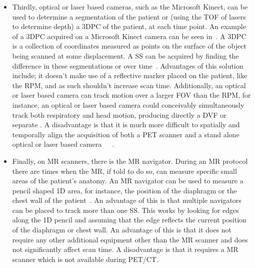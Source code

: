 \begin{itemize}
                    \item Thirdly, optical or laser based cameras, such as the Microsoft Kinect, can be used to determine a segmentation of the patient or (using the \gls{TOF} of lasers to determine depth) a \gls{3DPC} of the patient, at each time point. An example of a \gls{3DPC} acquired on a Microsoft Kinect camera can be seen in~. A \gls{3DPC} is a collection of coordinates measured as points on the surface of the object being scanned at some displacement. A \gls{SS} can be acquired by finding the difference in these segmentations or  over time~. Advantages of this solution include; it doesn't make use of a reflective marker placed on the patient, like the \gls{RPM}, and as such shouldn't increase scan time. Additionally, an optical or laser based camera can track motion over a larger \gls{FOV} than the \gls{RPM}, for instance, an optical or laser based camera could conceivably simultaneously track both respiratory and head motion, producing directly a \gls{DVF} or separate . A disadvantage is that it is much more difficult to spatially and temporally align the acquisition of both a \gls{PET} scanner and a stand alone optical or laser based camera~~~.
                    
                    \item Finally, on \gls{MR} scanners, there is the \gls{MR} navigator. During an \gls{MR} protocol there are times when the \gls{MR}, if told to do so, can measure specific small areas of the patient's anatomy. An \gls{MR} navigator can be used to measure a pencil shaped \gls{1D} area, for instance, the position of the diaphragm or the chest wall of the patient~. An advantage of this is that multiple navigators can be placed to track more than one \gls{SS}. This works by looking for edges along the \gls{1D} pencil and assuming that the edge reflects the current position of the diaphragm or chest wall. An advantage of this is that it does not require any other additional equipment other than the \gls{MR} scanner and does not significantly affect scan time. A disadvantage is that it requires a \gls{MR} scanner which is not available during \gls{PET}/\gls{CT}.
                \end{itemize}
                
